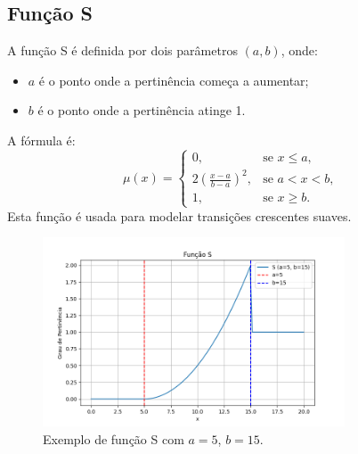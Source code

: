 \documentclass[a4paper,12pt]{article}
\begin{document}
\subsection{Função S}
A função S é definida por dois parâmetros $(a, b)$, onde:
\begin{itemize}
    \item $a$ é o ponto onde a pertinência começa a aumentar;
    \item $b$ é o ponto onde a pertinência atinge 1.
\end{itemize}
A fórmula é:
\[
\mu(x) =
\begin{cases}
0, & \text{se } x \leq a, \\
2\left(\frac{x - a}{b - a}\right)^2, & \text{se } a < x < b, \\
1, & \text{se } x \geq b.
\end{cases}
\]
Esta função é usada para modelar transições crescentes suaves.
\begin{figure}[H]
    \centering
    \includegraphics[width=0.8\textwidth]{img/s.png}
    \caption{Exemplo de função S com $a=5$, $b=15$.}
\end{figure}
\end{document}
